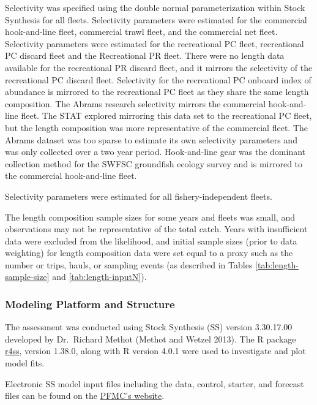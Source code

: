 \documentclass[
  english,
  a4paper,
]{article}
\begin{document}
Selectivity was specified using the double normal parameterization within Stock Synthesis for all fleets. Selectivity parameters were estimated for the commercial hook-and-line fleet, commercial trawl fleet, and the commercial net fleet. Selectivity parameters were estimated for the recreational PC fleet, recreational PC discard fleet and the Recreational PR fleet. There were no length data available for the recreational PR discard fleet, and it mirrors the selectivity of the recreational PC discard fleet.
Selectivity for the recreational PC onboard index of abundance is mirrored to the recreational
PC fleet as they share the same length composition. The Abrams research selectivity mirrors the
commercial hook-and-line fleet. The STAT explored mirroring this data set to the recreational PC fleet, but the length composition was more representative of the commercial fleet. The Abrams dataset was too sparse to estimate its own selectivity parameters and was only collected over a two year period. Hook-and-line gear was the
dominant collection method for the SWFSC groundfish ecology survey and is mirrored to the commercial hook-and-line fleet.

Selectivity parameters were estimated for all fishery-independent fleets.

The length composition sample sizes for some years and fleets was small, and observations may not be
representative of the total catch. Years with insufficient data were excluded from the likelihood, and initial sample sizes (prior to data weighting) for length composition data were set equal to a proxy such as the number or trips, hauls, or sampling events (as described in Tables \ref{tab:length-sample-size} and \ref{tab:length-inputN}).

\hypertarget{modeling-platform-and-structure}{%
\subsubsection{Modeling Platform and Structure}\label{modeling-platform-and-structure}}

The assessment was conducted using Stock Synthesis (SS) version 3.30.17.00 developed by
Dr.~Richard Methot (Methot and Wetzel 2013). The R package \href{https://github.com/r4ss/r4ss}{r4ss}, version
1.38.0, along with R version 4.0.1 were used to investigate and plot model fits.

Electronic SS model input files including the data, control, starter, and forecast files can be
found on the
\href{https://www.pcouncil.org/groundfish/stock-assessments/}{PFMC's website}.
\end{document}
